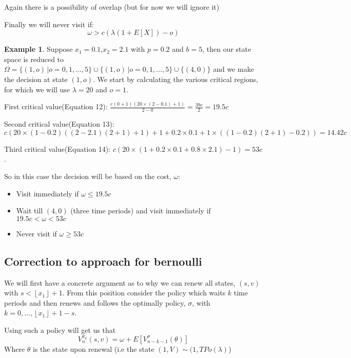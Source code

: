 \documentclass[a4paper,10pt]{article}
\newcommand{\floor}[1]{\left \lfloor #1 \right \rfloor}
\theoremstyle{definition}
\theoremstyle{definition}
\newtheorem{example}[theorem]{Example}
\theoremstyle{remark}
\theoremstyle{definition}
\begin{document}
Again there is a possibility of overlap (but for now we will ignore it)

Finally we will never visit if:
\begin{equation}
\omega > c(\lambda (1+E[X])-o)
\end{equation}


\begin{example}
Suppose $x_{1}=0.1$,$x_{2}=2.1$ with $p=0.2$ and $b=5$, then our state space is reduced to $\Omega= \{ (1,o) \, | o=0,1,...,5 \} \cup \{ (1,o) \, | o=0,1,...,5 \} \cup \{ (4,0) \}$ and we make the decision at state $(1,o)$. We start by calculating the various critical regions, for which we will use $\lambda=20$ and $o=1$.

First critical value(Equation 12): $\frac{c(0+1)(20 \times (2-0.1)+1)}{2-0}=\frac{39c}{2}=19.5c$

Second critical value(Equation 13): $c(20 \times (1-0.2)((2-2.1)(2+1)+1)+1+0.2 \times 0.1 + 1 \times ((1-0.2)(2+1)-0.2))=14.42c$

Third critical value(Equation 14): $c(20 \times (1+ 0.2 \times 0.1+0.8 \times 2.1)-1)=53c$.

So in this case the decision will be based on the cost, $\omega$:
\begin{itemize}
\item Visit immediately if $\omega \leq 19.5c$
\item Wait till $(4,0)$ (three time periods) and visit immediately if $19.5c <\omega < 53c$
\item Never visit if $\omega \geq 53c$
\end{itemize}
\end{example}

\subsection{Correction to approach for bernoulli}
We will first have a concrete argument as to why we can renew all states, $(s,v)$ with $s < \floor{x_{1}}+1$. From this position consider the policy which waits $k$ time periods and then renews and follows the optimally policy, $\sigma$, with $k=0,...,\floor{x_{1}}+1-s$.

Using such a policy will get us that
\begin{equation}
V_{n}^{\pi_{k}}(s,v)=\omega+E[V_{n-k-1}^{\sigma}(\theta)]
\end{equation}
Where $\theta$ is the state upon renewal (i.e the state $(1,V) \sim (1,TPo(\lambda)$)
\end{document}
